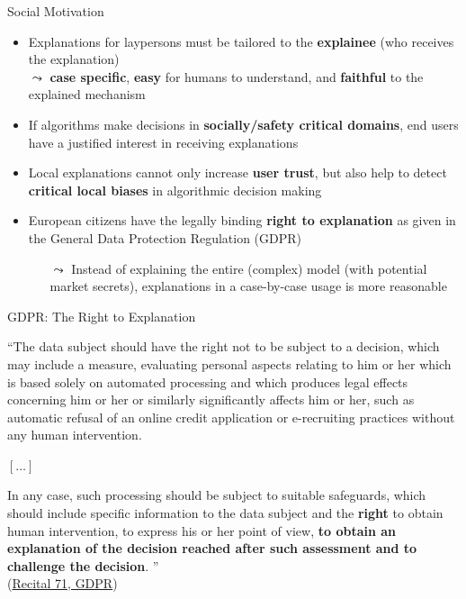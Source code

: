 \documentclass[11pt,compress,t,notes=noshow, aspectratio=169, xcolor=table]{beamer}
\begin{document}
\begin{frame}[c]{Social Motivation}

	\begin{itemize}
		\item Explanations for laypersons must be tailored to the \textbf{explainee} (who receives the explanation)\\ %
		$\leadsto$ \textbf{case specific}, \textbf{easy} for humans to understand, and \textbf{faithful} to the explained mechanism
		\pause
		\item If algorithms make decisions in \textbf{socially/safety critical domains}, end users have a justified interest in receiving explanations
		\pause
		\item Local explanations cannot only increase \textbf{user trust}, but also help to detect \textbf{critical local biases} in algorithmic decision making
		\pause
		\item European citizens have the legally binding \textbf{right to explanation} as given in the General Data Protection Regulation (GDPR)
		\begin{itemize}
		    \item[$\leadsto$] Instead of explaining the entire (complex) model (with potential market secrets), explanations in a case-by-case usage is more reasonable
		\end{itemize}

	\end{itemize}
\end{frame}


\begin{frame}[c]{GDPR: The Right to Explanation}

    ``The data subject should have the right not to be subject to a decision, which may include a measure, evaluating personal aspects relating to him or her which is based solely on automated processing and which produces legal effects concerning him or her or similarly significantly affects him or her, such as automatic refusal of an online credit application or e-recruiting practices without any human intervention.

$[\ldots]$

In any case, such processing should be subject to suitable safeguards, which should include specific information to the data subject and the \textbf{right} to obtain human intervention, to express his or her point of view, \textbf{to obtain an explanation of the decision reached after such assessment and to challenge the decision}.
'' \\[0.2cm] (\href{https://gdpr-text.com/read/recital-71/}{Recital 71, GDPR})
\end{frame}
\end{document}
